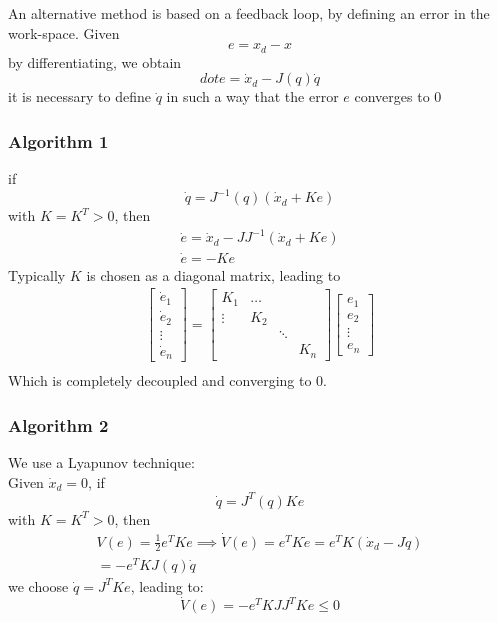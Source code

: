 \documentclass{book}
\begin{document}
An alternative method is based on a feedback loop, by defining an error in the work-space. Given
\[
    e=x_d-x
\]
by differentiating, we obtain
\[
    dot{e}=\dot{x}_d-J(q)\dot{q}
\]
it is necessary to define $\dot{q}$ in such a way that the error $e$ converges to $0$
\subsubsection{Algorithm 1}
if
\[
    \dot{q}=J^{-1}(q)(\dot{x}_d+Ke)
\]
with $K=K^T>0$, then
\begin{gather*}
    \dot{e}=\dot{x}_d-JJ^{-1}(\dot{x}_d+Ke)\\
    \dot{e}=-Ke
\end{gather*}
Typically $K$ is chosen as a diagonal matrix, leading to
\begin{gather*}
    \begin{bmatrix}
        \dot{e}_1 \\
        \dot{e}_2 \\
        \vdots \\
        \dot{e}_n
        \end{bmatrix}=\begin{bmatrix}
        K_1 & \dots & & \\
        \vdots & K_2 & & \\
               & & \ddots & \\
        & & & K_n
    \end{bmatrix} 
    \begin{bmatrix}
        e_1 \\
        e_2 \\
        \vdots \\
        e_n
        \end{bmatrix} \\
    \end{gather*}
Which is completely decoupled and converging to 0.
\subsubsection{Algorithm 2}
We use a Lyapunov technique:\\
Given $\dot{x}_d=0$, if
\[
    \dot{q}=J^T(q)Ke
\]
with $K=K^T>0$, then
\begin{gather*}
    V(e)=\frac{1}{2}e^TKe \implies \dot{V}(e)=e^TK\dot{e}=e^TK(\dot{x}_d-J\dot{q})\\
    =-e^TKJ(q)\dot{q}
\end{gather*}
we choose $\dot{q}=J^TKe$, leading to:
\[
    \dot{V}(e)=-e^TKJJ^TKe \leq 0
\]
\end{document}
